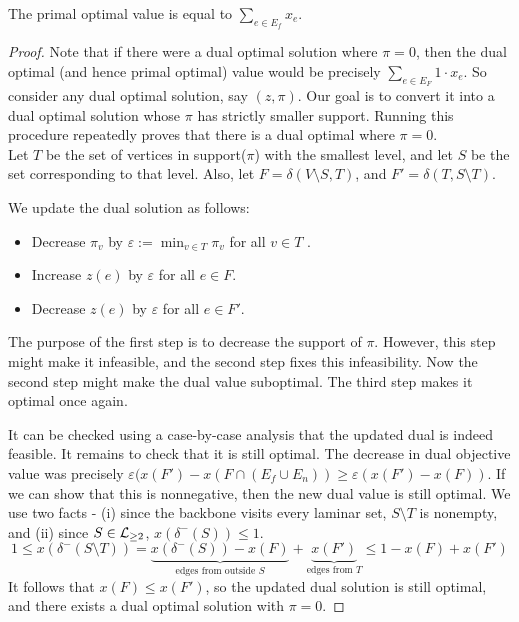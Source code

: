 \documentclass[./main.tex]{subfiles}
\newcommand{\level}{\textsf{\textup{level}}}
\begin{document}
	\vspace{2mm}
		\begin{claim}
			The primal optimal value is equal to $\sum_{e\in E_f}x_e$.
		\end{claim}
		\begin{proof}
			Note that if there were a dual optimal solution where $\pi = 0$, then the dual optimal (and hence primal optimal) value would be precisely $\sum_{e\in E_F}1\cdot x_e$.
			So consider any dual optimal solution, say $(z,\pi)$. Our goal is to convert it into a dual optimal solution whose $\pi$ has strictly smaller support.
			Running this procedure repeatedly proves that there is a dual optimal where $\pi = 0$.\vspace{2mm}\\
			Let $T$ be the set of vertices in support($\pi$) with the smallest \level, and let $S$ be the set corresponding to that \level.
			Also, let $F = \delta(V\setminus S, T)$, and $F' = \delta(T,S\setminus T)$.
			\vspace{5mm}

			We update the dual solution as follows:
			\begin{itemize}[-]
				\item Decrease $\pi_v$ by $\varepsilon := \min_{v\in T} \pi_v$ for all $v\in T$ .

				\item Increase $z(e)$ by $\varepsilon$ for all $e\in F$.

				\item Decrease $z(e)$ by $\varepsilon$ for all $e\in F'$.
			\end{itemize}
			The purpose of the first step is to decrease the support of $\pi$. However, this step might make it infeasible, and the second step fixes this infeasibility. Now the second step might make the dual value suboptimal. The third step makes it optimal once again.\vspace{2mm}

			It can be checked using a case-by-case analysis that the updated dual is indeed feasible.	It remains to check that it is still optimal.
			The decrease in dual objective value was precisely $\varepsilon (x(F') - x(F\cap( E_f\cup E_n))\geqslant \varepsilon(x(F') - x(F))$.
			If we can show that this is nonnegative, then the new dual value is still optimal. We use two facts - (i) since the backbone visits every laminar set, $S\setminus T$ is nonempty, and (ii) since $S\in \mathcal{L}_{\geq 2}$, $x(\delta^-(S))\leqslant 1$.
			\[
				1\leqslant x(\delta^-(S\setminus T)) = \underbrace{x(\delta^-(S)) - x(F)}_{\text{edges from outside } S} + \underbrace{x(F')}_{\text{edges from } T}\leqslant 1 - x(F) + x(F')
			\]
			It follows that $x(F)\leqslant x(F')$, so the updated dual solution is still optimal, and there exists a dual optimal solution with $\pi = 0$.
		\end{proof}
\end{document}

